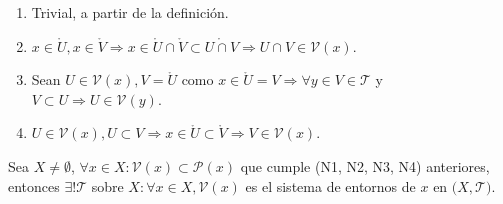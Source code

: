 \begin{dem}
  \begin{enumerate}[label=(\roman*)]
    \item Trivial, a partir de la definición.
    \item $x \in \mathring{U}, x \in \mathring{V} \Rightarrow x \in \mathring{U} \cap \mathring{V} \subset \mathring{U \cap V} \Rightarrow U \cap V \in \mathcal{V}(x)$.
    \item Sean $ U \in \mathcal{V}(x), V = \mathring{U}$ como $x \in \mathring{U} = V \Rightarrow \forall y \in V \in \mathcal{T}$ y $V \subset U \Rightarrow U \in \mathcal{V}(y)$.
    \item $U \in \mathcal{V}(x), U \subset V \Rightarrow x \in \mathring{U} \subset \mathring{V} \Rightarrow V \in \mathcal{V}(x)$.
  \end{enumerate}
\end{dem}

\begin{prop}
  Sea $X \neq \emptyset$, $ \forall x \in X: \mathcal{V}(x)  \subset \mathcal{P}(x)$ que cumple (N1, N2, N3, N4) anteriores, entonces $\exists! \mathcal{T}$ sobre $ X: \forall x \in X, \mathcal{V}(x)$ es el sistema de entornos de $x$ en $\big( X, \mathcal{T} \big)$.
\end{prop}
